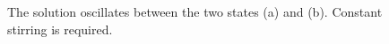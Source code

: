 \documentclass[twocolumn,amsmath,amssymb,aps]{revtex4}
\begin{document}
\begin{figure}
	\centering
	\caption{The solution oscillates between the two states (a) and (b). Constant stirring is required.}
	\label{fig:Osc}
\end{figure}
\end{document}
